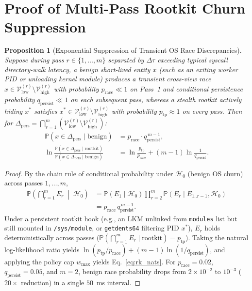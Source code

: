 \documentclass[10pt,twocolumn,letterpaper]{article}
\makeatletter
\theoremstyle{plain}
\newtheorem{proposition}[theorem]{Proposition}
\theoremstyle{definition}
\theoremstyle{remark}
\DeclareRobustCommand{\_}{\ifmmode\nfss@text{\textunderscore}\else\textunderscore\penalty\@highpenalty\hskip\z@skip\fi}
\makeatother
\begin{document}
\section{Proof of Multi-Pass Rootkit Churn Suppression}
\label{app:rootkit}

\begin{proposition}[Exponential Suppression of Transient OS Race Discrepancies]
\label{prop:rootkit_churn}
Suppose during pass $r \in \{1, \dots, m\}$ separated by $\Delta\tau$ exceeding typical syscall directory-walk latency, a benign short-lived entity $x$ (such as an exiting worker PID or unloading kernel module) produces a transient cross-view race $x \in \mathcal{V}_{\text{low}}^{(r)} \setminus \mathcal{V}_{\text{high}}^{(r)}$ with probability $p_{\text{race}} \ll 1$ on Pass~1 and conditional persistence probability $q_{\text{persist}} \ll 1$ on each subsequent pass, whereas a stealth rootkit actively hiding $x^*$ satisfies $x^* \in \mathcal{V}_{\text{low}}^{(r)} \setminus \mathcal{V}_{\text{high}}^{(r)}$ with probability $p_{\text{tp}} \approx 1$ on every pass. Then for $\Delta_{\text{pers}} = \bigcap_{r=1}^{m}(\mathcal{V}_{\text{low}}^{(r)} \setminus \mathcal{V}_{\text{high}}^{(r)})$:
\begin{align*}
  \mathbb{P}(x \in \Delta_{\text{pers}} \mid \text{benign}) &= p_{\text{race}} \cdot q_{\text{persist}}^{\,m - 1},\\
  \ln\frac{\mathbb{P}(x \in \Delta_{\text{pers}} \mid \text{rootkit})}{\mathbb{P}(x \in \Delta_{\text{pers}} \mid \text{benign})}
  &= \ln\frac{p_{\text{tp}}}{p_{\text{race}}} + (m - 1)\ln\frac{1}{q_{\text{persist}}}.
\end{align*}
\end{proposition}
\begin{proof}
By the chain rule of conditional probability under $\mathcal{H}_0$ (benign OS churn) across passes $1, \dots, m$,
\begin{align*}
  \mathbb{P}\!\left(\bigcap_{r=1}^{m} E_r \;\middle|\; \mathcal{H}_0\right)
  &= \mathbb{P}(E_1 \mid \mathcal{H}_0) \prod_{r=2}^{m} \mathbb{P}(E_r \mid E_{1..r-1}, \mathcal{H}_0)\\
  &= p_{\text{race}} \, q_{\text{persist}}^{\,m - 1}.
\end{align*}
Under a persistent rootkit hook (e.g., an LKM unlinked from \texttt{modules} list but still mounted in \texttt{/sys/module}, or \texttt{getdents64} filtering PID $x^*$), $E_r$ holds deterministically across passes ($\mathbb{P}(\bigcap_{r=1}^{m} E_r \mid \text{rootkit}) = p_{\text{tp}}$). Taking the natural log-likelihood ratio yields $\ln(p_{\text{tp}} / p_{\text{race}}) + (m - 1)\ln(1 / q_{\text{persist}})$, and applying the policy cap $w_{\max}$ yields Eq.~\eqref{eq:rk_nats}. For $p_{\text{race}} = 0.02$, $q_{\text{persist}} = 0.05$, and $m = 2$, benign race probability drops from $2 \times 10^{-2}$ to $10^{-3}$ ($20\times$ reduction) in a single $50$~ms interval.
\end{proof}
\end{document}
